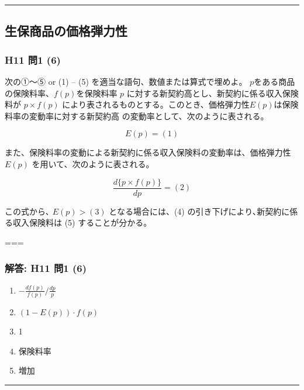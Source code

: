 \documentclass[
]{article}
\providecommand{\tightlist}{%
  \setlength{\itemsep}{0pt}\setlength{\parskip}{0pt}}
\begin{document}
\begin{center}\rule{0.5\linewidth}{0.5pt}\end{center}

\hypertarget{ux751fux4fddux5546ux54c1ux306eux4fa1ux683cux5f3eux529bux6027}{%
\subsection{生保商品の価格弾力性}\label{ux751fux4fddux5546ux54c1ux306eux4fa1ux683cux5f3eux529bux6027}}

\hypertarget{h11-ux554f1-6}{%
\subsubsection{H11 問1 (6)}\label{h11-ux554f1-6}}

次の①～⑤ or (1) -- (5) を適当な語句、数値または算式で埋めよ。
\(p\)をある商品の保険料率、\(𝑓(𝑝)\)を保険料率 \(p\)
に対する新契約高とし、新契約に係る収入保険料が \(𝑝 \times 𝑓(𝑝)\)
により表されるものとする。このとき、価格弾力性\(𝐸(𝑝)\)は保険料率の変動率に対する新契約高
の変動率として、次のように表される。

\[𝐸(𝑝) =  (1) \]

また、保険料率の変動による新契約に係る収入保険料の変動率は、価格弾力性
\(𝐸(𝑝)\) を用いて、次のように表される。

\[\frac{𝑑\{𝑝 \times 𝑓(𝑝)\} }{𝑑𝑝}= (2)\]

この式から､ \(𝐸(𝑝) \gt (3)\) となる場合には、(4)
の引き下げにより､新契約に係る収入保険料は (5) することが分かる。

===

\hypertarget{ux89e3ux7b54-h11-ux554f1-6}{%
\subsubsection{解答: H11 問1 (6)}\label{ux89e3ux7b54-h11-ux554f1-6}}

\begin{enumerate}
\def\labelenumi{(\arabic{enumi})}
\tightlist
\item
  \(-\frac{df(p)}{f(p)} / \frac{dp}{p}\)
\item
  \((1-E(p))\cdot f(p)\)
\item
  1
\item
  保険料率
\item
  増加
\end{enumerate}

\begin{center}\rule{0.5\linewidth}{0.5pt}\end{center}
\end{document}

